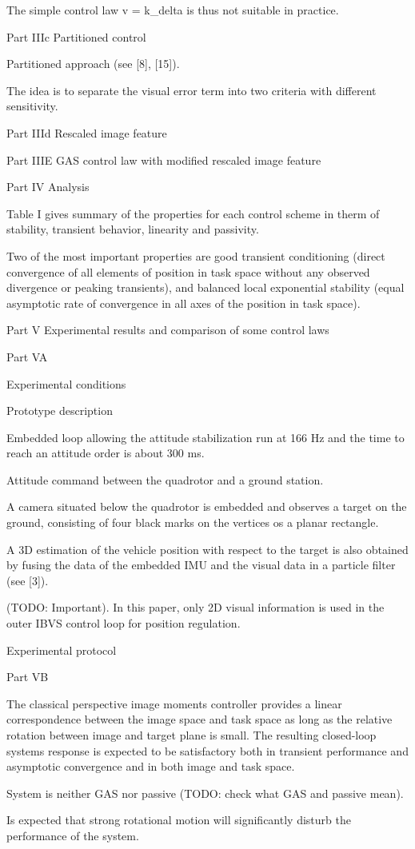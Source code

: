 The simple control law v = k_delta \delta is thus not suitable in practice.

Part IIIc Partitioned control

Partitioned approach (see [8], [15]).

The idea is to separate the visual error term into two criteria with different sensitivity.

Part IIId Rescaled image feature

Part IIIE GAS control law with modified rescaled image feature

Part IV Analysis

Table I gives summary of the properties for each control scheme in therm of stability, transient behavior, linearity and passivity.

Two of the most important properties are good transient conditioning (direct convergence of all elements of position in task space without any observed divergence or peaking transients), and balanced local exponential stability (equal asymptotic rate of convergence in all axes of the position in task space).

Part V Experimental results and comparison of some control laws

Part VA

Experimental conditions

Prototype description

Embedded loop allowing the attitude stabilization run at 166 Hz and the time to reach an attitude order is about 300 ms. 

Attitude command between the quadrotor and a ground station.

A camera situated below the quadrotor is embedded and observes a target on the ground, consisting of four black marks on the vertices os a planar rectangle.


A 3D estimation of the vehicle position with respect to the target is also obtained by fusing the data of the embedded IMU and the visual data in a particle filter (see [3]).

(TODO: Important). In this paper, only 2D visual information is used in the outer IBVS control loop for position regulation.

Experimental protocol

Part VB

The classical perspective image moments controller provides a linear correspondence between the image space and task space as long as the relative rotation between image and target plane is small. The resulting closed-loop systems response is expected to be satisfactory both in transient performance and asymptotic convergence and in both image and task space.

System is neither GAS nor passive (TODO: check what GAS and passive mean).

Is expected that strong rotational motion will significantly disturb the performance of the system.

\cite{bourquardez_stability_2006}
